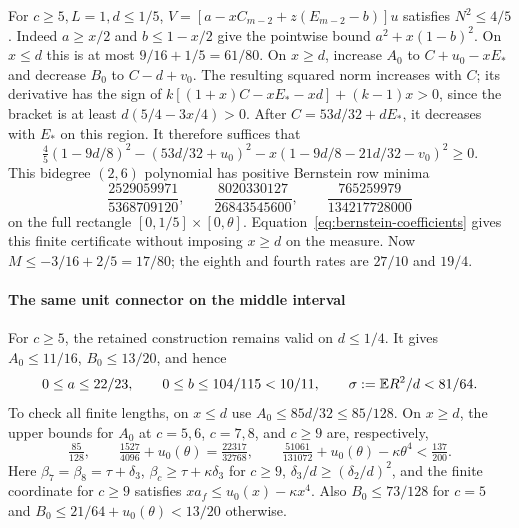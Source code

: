 For \(c\ge5,L=1,d\le1/5\),
\(V=[a-xC_{m-2}+z(E_{m-2}-b)]u\) satisfies
\(N^2\le4/5\).
Indeed \(a\ge x/2\) and \(b\le1-x/2\) give the pointwise bound
\(a^2+x(1-b)^2\). On \(x\le d\) this is at most
\(9/16+1/5=61/80\).
On \(x\ge d\), increase \(A_0\) to \(C+u_0-xE_*\) and decrease
\(B_0\) to \(C-d+v_0\). The resulting squared norm increases with
\(C\); its derivative has the sign of
\(k[(1+x)C-xE_*-xd]+(k-1)x>0\), since the bracket is at least
\(d(5/4-3x/4)>0\).
After \(C=53d/32+dE_*\), it decreases with \(E_*\) on this region.
It therefore suffices that
\begin{equation}\label{eq:outer-unit:receiver-polynomial}
 \tfrac45(1-9d/8)^2-(53d/32+u_0)^2
       -x(1-9d/8-21d/32-v_0)^2\ge0.
\end{equation}
This bidegree \((2,6)\) polynomial has positive Bernstein row minima
\[
 \frac{2529059971}{5368709120},\qquad
 \frac{8020330127}{26843545600},\qquad
 \frac{765259979}{134217728000}
\]
on the full rectangle \([0,1/5]\times[0,\theta]\).
Equation~\eqref{eq:bernstein-coefficients} gives this finite certificate
without imposing \(x\ge d\) on the measure.
Now \(M\le-3/16+2/5=17/80\); the eighth and fourth rates are
\(27/10\) and \(19/4\).

\paragraph{The same unit connector on the middle interval}
For \(c\ge5\), the retained construction remains valid on \(d\le1/4\).
It gives \(A_0\le11/16\), \(B_0\le13/20\), and hence
\begin{equation}\label{eq:outer-unit:middle-profile}
 0\le a\le22/23,\qquad0\le b\le104/115<10/11,\qquad
 \sigma:=\mathbb E R^2/d<81/64.
\end{equation}
To check all finite lengths, on \(x\le d\) use
\(A_0\le85d/32\le85/128\).
On \(x\ge d\), the upper bounds for \(A_0\) at
\(c=5,6\), \(c=7,8\), and \(c\ge9\) are, respectively,
\[
 \tfrac{85}{128},\qquad
 \tfrac{1527}{4096}+u_0(\theta)=\tfrac{22317}{32768},\qquad
 \tfrac{51061}{131072}+u_0(\theta)-\kappa\theta^4<\tfrac{137}{200}.
\]
Here \(\beta_7=\beta_8=\tau+\delta_3\),
\(\beta_c\ge\tau+\kappa\delta_3\) for \(c\ge9\),
\(\delta_3/d\ge(\delta_2/d)^2\), and the finite coordinate for
\(c\ge9\) satisfies \(xa_f\le u_0(x)-\kappa x^4\).
Also \(B_0\le73/128\) for \(c=5\) and
\(B_0\le21/64+u_0(\theta)<13/20\) otherwise.

